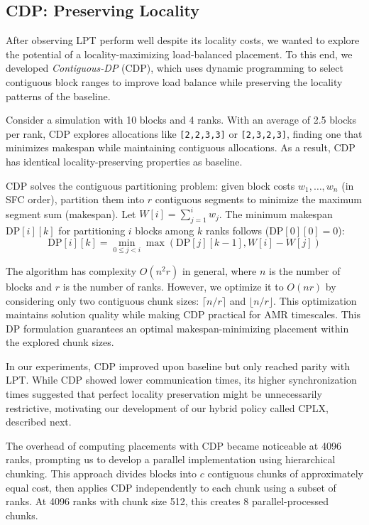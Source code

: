 \vspace{-5pt}
\subsection{CDP: Preserving Locality}\label{sec:amr:des:cdp}
After observing LPT perform well despite its locality costs, we wanted to explore the potential of
a locality-maximizing load-balanced placement.
To this end, we developed \emph{Contiguous-DP} (CDP), which uses dynamic programming to select
contiguous block ranges to improve load balance while preserving the locality patterns of the
baseline.

Consider a simulation with 10 blocks and 4 ranks.
With an average of 2.5 blocks per rank, CDP explores allocations like \texttt{[2,2,3,3]} or
\texttt{[2,3,2,3]}, finding one that minimizes makespan while maintaining contiguous allocations.
As a result, CDP has identical locality-preserving properties as baseline.

CDP solves the contiguous partitioning problem: given block costs $w_1, \dots, w_n$ (in SFC order),
partition them into $r$ contiguous segments to minimize the maximum segment sum (makespan).
Let $W[i] = \sum_{j=1}^{i} w_j$.
The minimum makespan $\text{DP}[i][k] $ for partitioning $i$ blocks among $k$ ranks follows
($\text{DP}[0][0] = 0$): \[ \text{DP}[i][k] = \min_{0 \le j < i} \max\left( \text{DP}[j][k-1] ,
  W[i] - W[j] \right) \]

The algorithm has complexity $O(n^2r)$ in general, where
$n$ is the number of blocks and $r$ is the number of ranks.
However, we optimize it to $O(nr)$ by considering only two contiguous chunk sizes: $\lceil n/r
  \rceil$ and $\lfloor n/r \rfloor$.
This optimization maintains solution quality while making CDP practical for AMR timescales.
This DP formulation guarantees an optimal makespan-minimizing placement within the explored chunk
sizes.

In our experiments, CDP improved upon baseline but only reached parity with LPT.
While CDP showed lower communication times, its higher synchronization times suggested that perfect
locality preservation might be unnecessarily restrictive, motivating our development of our hybrid
policy called CPLX, described next.

The overhead of computing placements with CDP became noticeable at 4096 ranks, prompting us to
develop a parallel implementation using hierarchical chunking.
This approach divides blocks into $c$ contiguous chunks of approximately equal cost, then applies
CDP independently to each chunk using a subset of ranks.
At 4096 ranks with chunk size 512, this creates 8 parallel-processed chunks.

